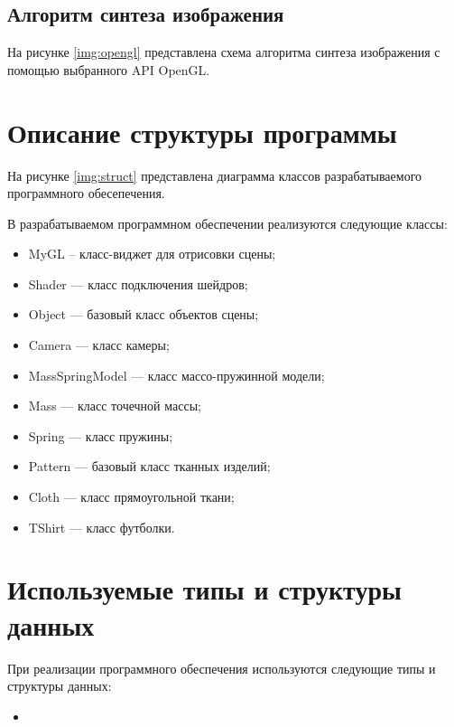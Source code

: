 
\clearpage
\subsection{Алгоритм синтеза изображения}

На рисунке \ref{img:opengl} представлена схема алгоритма синтеза
изображения с помощью выбранного API OpenGL.


\section{Описание структуры программы}

На рисунке \ref{img:struct} представлена диаграмма классов разрабатываемого
программного обесепечения.


В разрабатываемом программном обеспечении реализуются следующие классы:
\begin{itemize}
    \item MyGL -- класс-виджет для отрисовки сцены;
    \item Shader --- класс подключения шейдров;
    \item Object --- базовый класс объектов сцены;
    \item Camera --- класс камеры;
    \item MassSpringModel --- класс массо-пружинной модели;
    \item Mass --- класс точечной массы;
    \item Spring --- класс пружины;
    \item Pattern --- базовый класс тканных изделий;
    \item Cloth --- класс прямоугольной ткани;
    \item TShirt --- класс футболки.
\end{itemize}

\section{Используемые типы и структуры данных}

При реализации программного обеспечения используются следующие типы и
структуры данных:
\begin{itemize}
    \item
\end{itemize}




